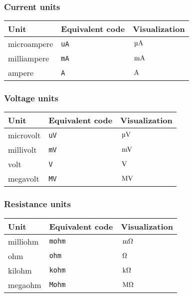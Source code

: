\documentclass[11pt,a4paper,openany]{book}
\newcommand*{\cs}[1]{\texttt{\char92#1}}
\begin{document}
\subsubsection{Current units}
\begin{center}
\begin{tabular}{lll}
\toprule
Unit & Equivalent code & Visualization\\
\midrule
microampere & \cs{uA} & $\uA$ \\
milliampere & \cs{mA} & $\mA$ \\
ampere & \cs{A} & $\A$ \\
\bottomrule
\end{tabular}
\end{center}
\subsubsection{Voltage units}
\begin{center}
\begin{tabular}{lll}
\toprule
Unit & Equivalent code & Visualization\\
\midrule
microvolt & \cs{uV} & $\uV$ \\
millivolt & \cs{mV} & $\mV$ \\
volt & \cs{V} & $\V$\\
megavolt & \cs{MV} & $\MV$\\
\bottomrule
\end{tabular}
\end{center}
\subsubsection{Resistance units}
\begin{center}
\begin{tabular}{lll}
\toprule
Unit & Equivalent code & Visualization\\
\midrule
milliohm & \cs{mohm} & $\mohm$ \\
ohm & \cs{ohm} & $\ohm$\\
kilohm & \cs{kohm} & $\kohm$\\
megaohm & \cs{Mohm} & $\Mohm$\\
\bottomrule
\end{tabular}
\end{center}
\end{document}
